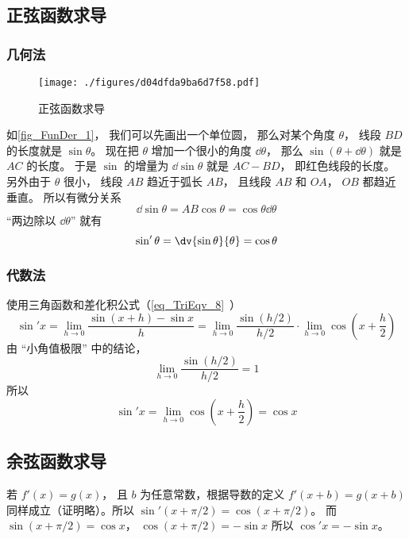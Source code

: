 \subsection{正弦函数求导}
\subsubsection{几何法}
\begin{figure}[ht]
\centering
\texttt{[image: ./figures/d04dfda9ba6d7f58.pdf]}
\caption{正弦函数求导} \label{fig_FunDer_1}
\end{figure}
如\autoref{fig_FunDer_1}， 我们可以先画出一个单位圆， 那么对某个角度 $\theta$， 线段 $BD$ 的长度就是 $\sin\theta$。 现在把 $\theta$ 增加一个很小的角度 $\dd{\theta}$， 那么 $\sin(\theta+\dd{\theta})$ 就是 $AC$ 的长度。 于是 $\sin$ 的增量为 $\dd{\sin\theta}$ 就是 $AC - BD$， 即红色线段的长度。 另外由于 $\theta$ 很小， 线段 $AB$ 趋近于弧长 $AB$， 且线段 $AB$ 和 $OA$， $OB$ 都趋近垂直。 所以有微分关系
\begin{equation}
\dd{\sin\theta} = AB \cos\theta = \cos\theta \dd{\theta}
\end{equation}
“两边除以 $\dd{\theta}$” 就有
\begin{equation}
\sin'\theta = \dv{\sin\theta}{\theta} = \cos\theta
\end{equation}

\subsubsection{代数法}
使用三角函数和差化积公式（\autoref{eq_TriEqv_8}~）
\begin{equation}
\sin'x = \lim_{h \to 0} \frac{\sin (x + h) - \sin x}{h} = \lim_{h \to 0} \frac{\sin (h/2)}{h/2} \cdot \lim_{h \to 0}\cos( x + \frac{h}{2})
\end{equation}
由 “小角值极限” 中的结论，
\begin{equation}
\lim_{h \to 0} \frac{\sin (h/2)}{h/2} = 1
\end{equation}
所以
\begin{equation}
\sin'x =  \lim_{h \to 0}\cos( x + \frac{h}{2}) = \cos x
\end{equation}

\subsection{余弦函数求导}
若 $f'(x) = g(x)$， 且 $b$ 为任意常数，根据导数的定义 $f'(x + b) = g(x + b)$ 同样成立（证明略）。所以 $\sin'(x + \pi/2) = \cos(x + \pi/2)$。 而 $\sin(x + \pi/2) = \cos x$，  $\cos(x + \pi/2) =  - \sin x$ 所以 $\cos' x =  - \sin x$。

